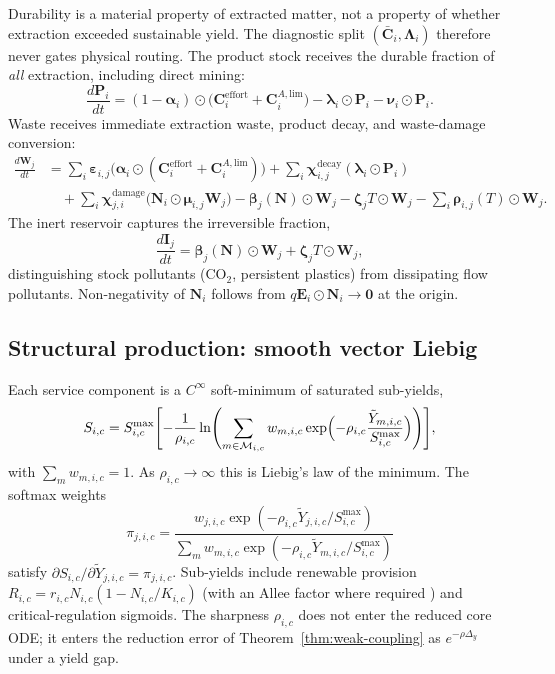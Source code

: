 \documentclass[11pt]{article}
\theoremstyle{definition}
\begin{document}
Durability is a material property of extracted matter, not a property of whether extraction exceeded sustainable yield. The diagnostic split $(\bar{\mathbf C}_i,\boldsymbol\Lambda_i)$ therefore never gates physical routing. The product stock receives the durable fraction of \emph{all} extraction, including direct mining:
\begin{equation}
\frac{d\mathbf P_i}{dt}
= (1-\boldsymbol\alpha_i)\odot\bigl(\mathbf C_i^{\mathrm{effort}}+\mathbf C^{A,\mathrm{lim}}_i\bigr)
- \boldsymbol\lambda_i\odot\mathbf P_i
- \boldsymbol\nu_i\odot\mathbf P_i.
\label{eq:product}
\end{equation}
Waste receives immediate extraction waste, product decay, and waste-damage conversion:
\begin{align}
\frac{d\mathbf W_j}{dt}
&= \sum_i\boldsymbol\varepsilon_{i,j}\bigl(\boldsymbol\alpha_i\odot(\mathbf C_i^{\mathrm{effort}}+\mathbf C^{A,\mathrm{lim}}_i)\bigr)
+ \sum_i\boldsymbol\chi^{\mathrm{decay}}_{i,j}(\boldsymbol\lambda_i\odot\mathbf P_i)
\nonumber\\
&\quad + \sum_i\boldsymbol\chi^{\mathrm{damage}}_{j,i}\bigl(\mathbf N_i\odot\boldsymbol\mu_{i,j}\mathbf W_j\bigr)
- \boldsymbol\beta_j(\mathbf N)\odot\mathbf W_j
- \boldsymbol\zeta_j T\odot\mathbf W_j
- \sum_i\boldsymbol\rho_{i,j}(T)\odot\mathbf W_j.
\label{eq:wvec}
\end{align}
The inert reservoir captures the irreversible fraction,
\begin{equation}
\frac{d\mathbf I_j}{dt}=\boldsymbol\beta_j(\mathbf N)\odot\mathbf W_j+\boldsymbol\zeta_j T\odot\mathbf W_j,
\label{eq:ivec}
\end{equation}
distinguishing stock pollutants (CO$_2$, persistent plastics) from dissipating flow pollutants. Non-negativity of $\mathbf N_i$ follows from $q\mathbf E_i\odot\mathbf N_i\to\mathbf 0$ at the origin.

\subsection{Structural production: smooth vector Liebig}
\label{sec:structural-production}

Each service component is a $C^\infty$ soft-minimum of saturated sub-yields,
\[
S_{i,c}=S_{i,c}^{\max}\Biggl[-\frac1{\rho_{i,c}}\ln\Biggl(\sum_{m\in\mathcal M_{i,c}}w_{m,i,c}
\exp\Bigl(-\rho_{i,c}\frac{\tilde Y_{m,i,c}}{S_{i,c}^{\max}}\Bigr)\Biggr)\Biggr],
\]
with $\sum_m w_{m,i,c}=1$. As $\rho_{i,c}\to\infty$ this is Liebig's law of the minimum. The softmax weights
\[
\pi_{j,i,c}=\frac{w_{j,i,c}\exp(-\rho_{i,c}\tilde Y_{j,i,c}/S_{i,c}^{\max})}{\sum_m w_{m,i,c}\exp(-\rho_{i,c}\tilde Y_{m,i,c}/S_{i,c}^{\max})}
\]
satisfy $\partial S_{i,c}/\partial\tilde Y_{j,i,c}=\pi_{j,i,c}$. Sub-yields include renewable provision $R_{i,c}=r_{i,c}N_{i,c}(1-N_{i,c}/K_{i,c})$ (with an Allee factor where required \cite{courchamp1999,kramer2009}) and critical-regulation sigmoids. The sharpness $\rho_{i,c}$ does not enter the reduced core ODE; it enters the reduction error of Theorem~\ref{thm:weak-coupling} as $e^{-\rho\Delta_y}$ under a yield gap.
\end{document}
